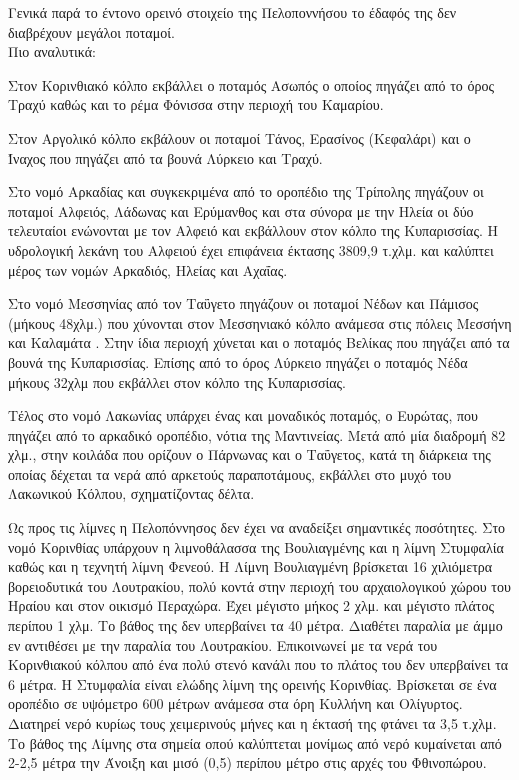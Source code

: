 \documentclass[12pt]{article}
\begin{document}
	Γενικά παρά το έντονο ορεινό στοιχείο της Πελοποννήσου το έδαφός της δεν διαβρέχουν μεγάλοι ποταμοί.\\
	Πιο αναλυτικά:
	
	Στον  Κορινθιακό κόλπο εκβάλλει ο ποταμός Ασωπός ο οποίος πηγάζει από το όρος Τραχύ καθώς και το ρέμα Φόνισσα στην περιοχή του Καμαρίου.
	
	Στον Αργολικό κόλπο εκβάλουν οι ποταμοί Τάνος, Ερασίνος (Κεφαλάρι) και ο Ίναχος που πηγάζει από τα βουνά Λύρκειο και Τραχύ.
	
	Στο νομό Αρκαδίας και συγκεκριμένα από το οροπέδιο της Τρίπολης πηγάζουν οι ποταμοί Αλφειός, Λάδωνας και Ερύμανθος και στα σύνορα με την Ηλεία οι δύο τελευταίοι ενώνονται με τον Αλφειό και εκβάλλουν στον κόλπο της Κυπαρισσίας. Η υδρολογική λεκάνη του Αλφειού έχει επιφάνεια έκτασης 3809,9 τ.χλμ. και καλύπτει μέρος των νομών Αρκαδιός, Ηλείας και Αχαΐας.
	
	Στο νομό Μεσσηνίας από τον Ταΰγετο πηγάζουν οι ποταμοί Νέδων και Πάμισος (μήκους 48χλμ.) που χύνονται στον Μεσσηνιακό κόλπο ανάμεσα στις πόλεις Μεσσήνη και Καλαμάτα . Στην ίδια περιοχή χύνεται και ο ποταμός Βελίκας που πηγάζει από τα βουνά της Κυπαρισσίας. Επίσης από το όρος Λύρκειο πηγάζει ο ποταμός Νέδα μήκους 32χλμ που εκβάλλει στον κόλπο της Κυπαρισσίας.
	
	Τέλος στο νομό Λακωνίας υπάρχει ένας και μοναδικός ποταμός, ο Ευρώτας, που πηγάζει από το αρκαδικό οροπέδιο, νότια της Μαντινείας. Μετά από μία διαδρομή 82 χλμ., στην κοιλάδα που ορίζουν ο Πάρνωνας και ο Ταΰγετος, κατά τη διάρκεια της οποίας δέχεται τα νερά από αρκετούς παραποτάμους, εκβάλλει στο μυχό του Λακωνικού Κόλπου, σχηματίζοντας δέλτα. 
	
	Ως προς τις λίμνες η Πελοπόννησος δεν έχει να αναδείξει σημαντικές ποσότητες. Στο νομό Κορινθίας υπάρχουν η λιμνοθάλασσα της Βουλιαγμένης και η λίμνη Στυμφαλία καθώς και η τεχνητή λίμνη Φενεού. Η Λίμνη Βουλιαγμένη βρίσκεται 16 χιλιόμετρα βορειοδυτικά του Λουτρακίου, πολύ κοντά στην περιοχή του αρχαιολογικού χώρου του Ηραίου και στον οικισμό Περαχώρα. Έχει μέγιστο μήκος 2 χλμ. και μέγιστο πλάτος περίπου 1 χλμ. Το βάθος της δεν υπερβαίνει τα 40 μέτρα. Διαθέτει παραλία με άμμο εν αντιθέσει με την παραλία του Λουτρακίου. Επικοινωνεί με τα νερά του Κορινθιακού κόλπου από ένα πολύ στενό κανάλι που το πλάτος του δεν υπερβαίνει τα 6 μέτρα. Η Στυμφαλία είναι ελώδης λίμνη της ορεινής Κορινθίας. Βρίσκεται σε ένα οροπέδιο σε υψόμετρο 600 μέτρων ανάμεσα στα όρη Κυλλήνη και Ολίγυρτος. Διατηρεί νερό κυρίως τους χειμερινούς μήνες και η έκτασή της φτάνει τα 3,5 τ.χλμ. Το βάθος της Λίμνης στα σημεία οπού καλύπτεται μονίμως από νερό κυμαίνεται από 2-2,5 μέτρα την Άνοιξη και μισό (0,5) περίπου μέτρο στις αρχές του Φθινοπώρου.
	
\end{document}
